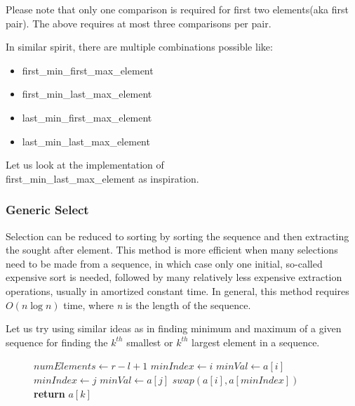 
Please note that only one comparison is required for first two elements(aka first pair). The above requires at most three comparisons per pair.

\vspace{1mm}

In similar spirit, there are multiple combinations possible like:
\begin{itemize}
    \item first\_min\_first\_max\_element
    \item first\_min\_last\_max\_element
    \item last\_min\_first\_max\_element
    \item last\_min\_last\_max\_element
\end{itemize}
Let us look at the implementation of \\first\_min\_last\_max\_element as inspiration.


\subsubsection*{Generic Select}
Selection can be reduced to sorting by sorting the sequence and then extracting the sought after element. This method is more efficient when many selections need to be made from a sequence, in which case only one initial, so-called expensive sort is needed, followed by many relatively less expensive extraction operations, usually in amortized constant time. In general, this method requires $O(n \log n)$ time, where \emph{n} is the length of the sequence.

\vspace{1mm}

Let us try using similar ideas as in finding minimum and maximum of a given sequence for finding the $k^{th}$ smallest or $k^{th}$ largest element in a sequence.

\begin{figure}[H]
\begin{center}
\end{center}
\begin{algorithmic}[1]
    \State $numElements \gets r - l + 1$
        \State $minIndex \gets i$
        \State $minVal \gets a[i]$
                \State $minIndex \gets j$
                \State $minVal \gets a[j]$
            \EndIf
        \EndFor
            \State $swap(a[i], a[minIndex])$
        \EndFor
    \State \textbf{return} $a[k]$
\EndFunction
\end{algorithmic}
\end{figure}

